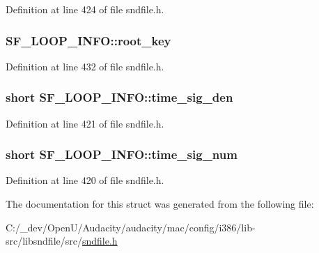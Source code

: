 Definition at line 424 of file sndfile.\+h.

\subsubsection[{\texorpdfstring{root\+\_\+key}{root_key}}]{ S\+F\+\_\+\+L\+O\+O\+P\+\_\+\+I\+N\+F\+O\+::root\+\_\+key}\hypertarget{struct_s_f___l_o_o_p___i_n_f_o_a2755451bf6c64d3c0f8202d7e427f6b8}{}\label{struct_s_f___l_o_o_p___i_n_f_o_a2755451bf6c64d3c0f8202d7e427f6b8}


Definition at line 432 of file sndfile.\+h.

\subsubsection[{\texorpdfstring{time\+\_\+sig\+\_\+den}{time_sig_den}}]{\setlength{\rightskip}{0pt plus 5cm}short S\+F\+\_\+\+L\+O\+O\+P\+\_\+\+I\+N\+F\+O\+::time\+\_\+sig\+\_\+den}\hypertarget{struct_s_f___l_o_o_p___i_n_f_o_a0a90aff8f6d4a38e70beea2ee589df8e}{}\label{struct_s_f___l_o_o_p___i_n_f_o_a0a90aff8f6d4a38e70beea2ee589df8e}


Definition at line 421 of file sndfile.\+h.

\subsubsection[{\texorpdfstring{time\+\_\+sig\+\_\+num}{time_sig_num}}]{\setlength{\rightskip}{0pt plus 5cm}short S\+F\+\_\+\+L\+O\+O\+P\+\_\+\+I\+N\+F\+O\+::time\+\_\+sig\+\_\+num}\hypertarget{struct_s_f___l_o_o_p___i_n_f_o_a6ece67f0077c22fadbc875e0250ad656}{}\label{struct_s_f___l_o_o_p___i_n_f_o_a6ece67f0077c22fadbc875e0250ad656}


Definition at line 420 of file sndfile.\+h.



The documentation for this struct was generated from the following file\+:\begin{DoxyCompactItemize}
\item 
C\+:/\+\_\+dev/\+Open\+U/\+Audacity/audacity/mac/config/i386/lib-\/src/libsndfile/src/\hyperlink{mac_2config_2i386_2lib-src_2libsndfile_2src_2sndfile_8h}{sndfile.\+h}\end{DoxyCompactItemize}
